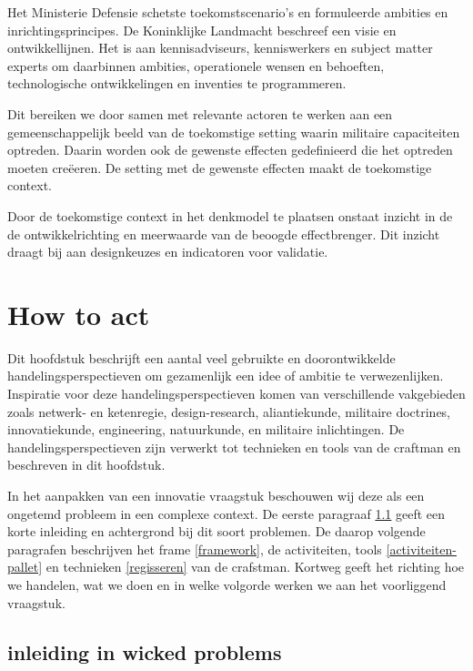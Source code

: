 \documentclass[
]{book}
\begin{document}
Het Ministerie Defensie schetste toekomstscenario's en formuleerde ambities en inrichtingsprincipes. De Koninklijke Landmacht beschreef een visie en ontwikkellijnen. Het is aan kennisadviseurs, kenniswerkers en subject matter experts om daarbinnen ambities, operationele wensen en behoeften, technologische ontwikkelingen en inventies te programmeren.

Dit bereiken we door samen met relevante actoren te werken aan een gemeenschappelijk beeld van de toekomstige setting waarin militaire capaciteiten optreden. Daarin worden ook de gewenste effecten gedefinieerd die het optreden moeten creëeren. De setting met de gewenste effecten maakt de toekomstige context.

Door de toekomstige context in het denkmodel te plaatsen onstaat inzicht in de de ontwikkelrichting en meerwaarde van de beoogde effectbrenger. Dit inzicht draagt bij aan designkeuzes en indicatoren voor validatie.

\hypertarget{cde-design-model}{%
\chapter{How to act}\label{cde-design-model}}

Dit hoofdstuk beschrijft een aantal veel gebruikte en doorontwikkelde handelingsperspectieven om gezamenlijk een idee of ambitie te verwezenlijken. Inspiratie voor deze handelingsperspectieven komen van verschillende vakgebieden zoals netwerk- en ketenregie, design-research, aliantiekunde, militaire doctrines, innovatiekunde, engineering, natuurkunde, en militaire inlichtingen. De handelingsperspectieven zijn verwerkt tot technieken en tools van de craftman en beschreven in dit hoofdstuk.

In het aanpakken van een innovatie vraagstuk beschouwen wij deze als een ongetemd probleem in een complexe context. De eerste paragraaf \ref{inleiding-in-wicked-problems} geeft een korte inleiding en achtergrond bij dit soort problemen. De daarop volgende paragrafen beschrijven het frame \ref{framework}, de activiteiten, tools \ref{activiteiten-pallet} en technieken \ref{regisseren} van de crafstman. Kortweg geeft het richting hoe we handelen, wat we doen en in welke volgorde werken we aan het voorliggend vraagstuk.

\hypertarget{inleiding-in-wicked-problems}{%
\section{inleiding in wicked problems}\label{inleiding-in-wicked-problems}}
\end{document}
